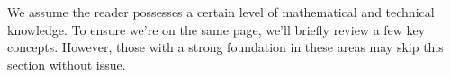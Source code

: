 We assume the reader possesses a certain level of mathematical and technical knowledge. 
To ensure we're on the same page, we'll briefly review a few key concepts. However, those 
with a strong foundation in these areas may skip this section without issue.
